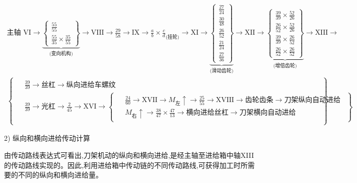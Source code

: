 \documentclass[UTF8]{ctexbook}
\newcommand{\◎}{\ensuremath{\bigcirc}}
\begin{document}
	\begin{multline*}
	\text{主轴 VI} \to
	\underbrace{
		\begin{Bmatrix}
			\frac{55}{55} \\
			\frac{55}{35} \times \frac{35}{55}
		\end{Bmatrix}
	}_{\text{(变向机构)}}
	\to \text{VIII} \to \frac{29}{58} \to \text{IX} \to \frac{a}{b} \times \frac{c}{d}_{\text{(挂轮)}} \to \text{XI} \to 
	\underbrace{
		\begin{Bmatrix}
			\frac{27}{24} \\
			\frac{30}{48} \\
			\frac{26}{52} \\
			\frac{21}{24} \\
			\frac{27}{36}
	\end{Bmatrix}}_{\text{(滑动齿轮)}}
	\to \text{XII} \to
	\underbrace{
		\begin{Bmatrix}
			\frac{39}{39} \times \frac{52}{26} \\
			\frac{26}{52} \times \frac{52}{26} \\
			\frac{39}{39} \times \frac{26}{52} \\
			\frac{26}{52} \times \frac{26}{52}
		\end{Bmatrix}
	}_{\text{(增倍齿轮)}}
	\to \text{XIII} \to \\
	\begin{Bmatrix}
		\begin{aligned}  %
			&\frac{39}{39} \to \text{丝杠} \to \text{纵向进给车螺纹} \\
			&\frac{39}{39} \to \text{光杠} \to \frac{2}{45} \to \text{XVI} \to 
			\begin{Bmatrix}
				\begin{aligned}
					&\frac{24}{60} \to \text{XVII} \to M_{\text{左}} \uparrow \to \frac{25}{55} \to \text{XVIII} \to \text{齿轮齿条} \to \text{刀架纵向自动进给} \\
					&M_{\text{右}} \uparrow \to \frac{38}{47} \times \frac{47}{13} \to \text{横向进给丝杠} \to \text{刀架横向自动进给}
				\end{aligned}
			\end{Bmatrix}
		\end{aligned}
	\end{Bmatrix}
\end{multline*}

2) 纵向和横向进给传动计算

由传动路线表达式可看出,刀架机动的纵向和横向进给,是经主轴至进给箱中轴XIII的传动路线实现的。因此,利用进给箱中传动链的不同传动路线,可获得加工时所需要的不同的纵向和横向进给量。
\end{document}
